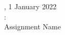 \newcommand{\dueDate}{1 January 2022}
\newcommand{\assignment}{Assignment Name}

\begin{center}
    \textbf{\name}, \dueDate\\
    \courseNumber: \textit{\courseName}\\
    \assignment
\end{center}


